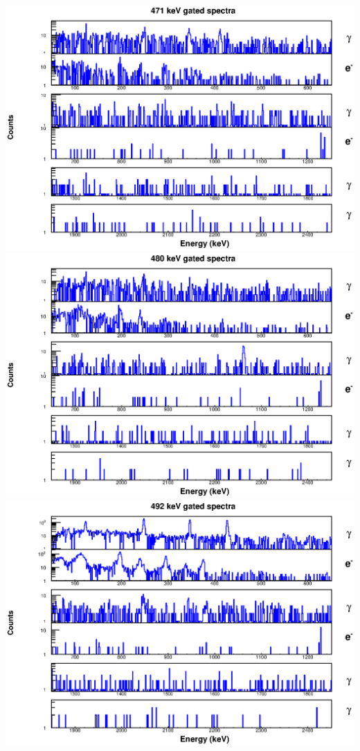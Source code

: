 \includegraphics[scale=0.8]{154Gd_Appendix/471_combined.eps}
\includegraphics[scale=0.8]{154Gd_Appendix/480_combined.eps}
\includegraphics[scale=0.8]{154Gd_Appendix/492_combined.eps}
